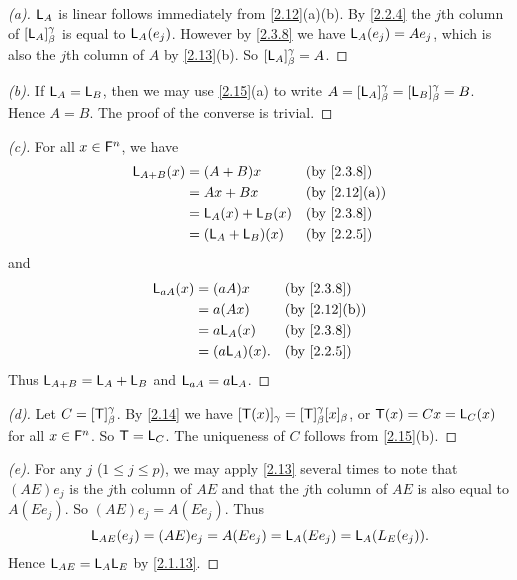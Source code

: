 \begin{proof}[(a)]
  \(\mathsf{L}_A\) is linear follows immediately from \cref{2.12}(a)(b).
  By \cref{2.2.4} the \(j\)th column of \([\mathsf{L}_A]_{\beta}^{\gamma}\) is equal to \(\mathsf{L}_A(e_j)\).
  However by \cref{2.3.8} we have \(\mathsf{L}_A(e_j) = A e_j\), which is also the \(j\)th column of \(A\) by \cref{2.13}(b).
  So \([\mathsf{L}_A]_{\beta}^{\gamma} = A\).
\end{proof}

\begin{proof}[(b)]
  If \(\mathsf{L}_A = \mathsf{L}_B\), then we may use \cref{2.15}(a) to write \(A = [\mathsf{L}_A]_{\beta}^{\gamma} = [\mathsf{L}_B]_{\beta}^{\gamma} = B\).
  Hence \(A = B\).
  The proof of the converse is trivial.
\end{proof}

\begin{proof}[(c)]
  For all \(x \in \mathsf{F}^n\), we have
  \begin{align*}
    \L_{A + B}(x) & = (A + B) x         &  & \by{2.3.8}   \\
                  & = Ax + Bx           &  & \by{2.12}[a] \\
                  & = \L_A(x) + \L_B(x) &  & \by{2.3.8}   \\
                  & = (\L_A + \L_B)(x)  &  & \by{2.2.5}
  \end{align*}
  and
  \begin{align*}
    \L_{aA}(x) & = (aA) x       &  & \by{2.3.8}   \\
               & = a (Ax)       &  & \by{2.12}[b] \\
               & = a \L_A(x)    &  & \by{2.3.8}   \\
               & = (a \L_A)(x). &  & \by{2.2.5}
  \end{align*}
  Thus \(\mathsf{L}_{A + B} = \mathsf{L}_A + \mathsf{L}_B\) and \(\mathsf{L}_{aA} = a \mathsf{L}_A\).
\end{proof}

\begin{proof}[(d)]
  Let \(C = [\mathsf{T}]_{\beta}^{\gamma}\).
  By \cref{2.14} we have \([\mathsf{T}(x)]_{\gamma} = [\mathsf{T}]_{\beta}^{\gamma} [x]_{\beta}\), or \(\mathsf{T}(x) = Cx = \mathsf{L}_C(x)\) for all \(x \in \mathsf{F}^n\).
  So \(\mathsf{T} = \mathsf{L}_C\).
  The uniqueness of \(C\) follows from \cref{2.15}(b).
\end{proof}

\begin{proof}[(e)]
  For any \(j\) (\(1 \leq j \leq p\)), we may apply \cref{2.13} several times to note that \((AE) e_j\) is the \(j\)th column of \(AE\) and that the \(j\)th column of \(AE\) is also equal to \(A (E e_j)\).
  So \((AE) e_j = A (Ee_j)\).
  Thus
  \[
    \mathsf{L}_{AE}(e_j) = (AE) e_j = A (E e_j) = \mathsf{L}_A(E e_j) = \mathsf{L}_A(L_E(e_j)).
  \]
  Hence \(\mathsf{L}_{AE} = \mathsf{L}_A \mathsf{L}_E\) by \cref{2.1.13}.
\end{proof}

